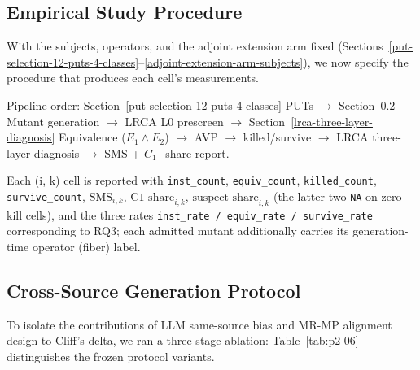 \documentclass[manuscript,screen,review]{acmart}
\begin{document}
\subsection{Empirical Study Procedure}\label{procedure-overview}

With the subjects, operators, and the adjoint extension arm fixed
(Sections~\ref{put-selection-12-puts-4-classes}--\ref{adjoint-extension-arm-subjects}), we now specify the procedure that produces each cell's
measurements.

\noindent\textsf{\small Pipeline order: Section~\ref{put-selection-12-puts-4-classes} PUTs $\to$ Section~\ref{cross-source-v4-protocol-summary} Mutant generation $\to$ LRCA L0 prescreen $\to$ Section~\ref{lrca-three-layer-diagnosis} Equivalence ($E_1 \wedge E_2$) $\to$ AVP $\to$ killed/survive $\to$ LRCA three-layer diagnosis $\to$ SMS + $C_1$\_share report.}

Each (i, k) cell is reported with \texttt{inst\_count},
\texttt{equiv\_count}, \texttt{killed\_count}, \texttt{survive\_count},
$\mathrm{SMS}_{i,k}$, $\mathrm{C1\_share}_{i,k}$,
$\mathrm{suspect\_share}_{i,k}$ (the latter two \texttt{NA} on
zero-kill cells), and the
three rates \texttt{inst\_rate\ /\ equiv\_rate\ /\ survive\_rate}
corresponding to RQ3; each admitted mutant additionally carries its
generation-time operator (fiber) label.

\subsection{Cross-Source Generation Protocol}\label{cross-source-v4-protocol-summary}

To isolate the contributions of LLM same-source bias and MR-MP alignment
design to Cliff's delta, we ran a three-stage ablation:
Table~\ref{tab:p2-06} distinguishes the frozen protocol variants.
\end{document}
